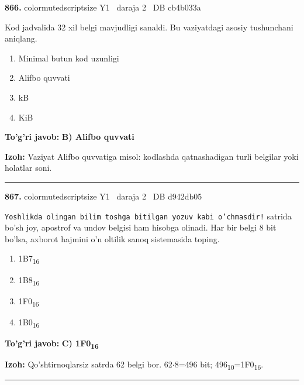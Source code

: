 \documentclass[10pt,a4paper,oneside]{article}
\begin{document}
\noindent\textbf{\color{ink}866.}  {color{muted}scriptsize Y1 \textbullet\ daraja 2 \textbullet\ DB cb4b033a}
\par
Kod jadvalida 32 xil belgi mavjudligi sanaldi. Bu vaziyatdagi asosiy tushunchani aniqlang.
\begin{enumerate}[label=\Alph*),leftmargin=9mm]
\item Minimal butun kod uzunligi
\item Alifbo quvvati
\item kB
\item KiB
\end{enumerate}
\begin{tcolorbox}[enhanced,breakable,colback=teal!4,colframe=teal!50!black,boxrule=0.5pt,arc=1.1mm,left=3mm,right=3mm,top=1.7mm,bottom=1.7mm,before skip=2mm,after skip=2mm]
\textbf{\color{teal}To'g'ri javob:} \textbf{B) Alifbo quvvati}
\par\smallskip
\textbf{Izoh:} Vaziyat Alifbo quvvatiga misol: kodlashda qatnashadigan turli belgilar yoki holatlar soni.
\end{tcolorbox}
\vspace{2mm}\hrule height 0.2pt \vspace{3mm}

\noindent\textbf{\color{ink}867.}  {color{muted}scriptsize Y1 \textbullet\ daraja 2 \textbullet\ DB d942db05}
\par
\texttt{Yoshlikda olingan bilim toshga bitilgan yozuv kabi o'chmasdir!} satrida bo'sh joy, apostrof va undov belgisi ham hisobga olinadi. Har bir belgi 8 bit bo'lsa, axborot hajmini o'n oltilik sanoq sistemasida toping.
\begin{enumerate}[label=\Alph*),leftmargin=9mm]
\item 1B7\textsubscript{1}\textsubscript{6}
\item 1B8\textsubscript{1}\textsubscript{6}
\item 1F0\textsubscript{1}\textsubscript{6}
\item 1B0\textsubscript{1}\textsubscript{6}
\end{enumerate}
\begin{tcolorbox}[enhanced,breakable,colback=teal!4,colframe=teal!50!black,boxrule=0.5pt,arc=1.1mm,left=3mm,right=3mm,top=1.7mm,bottom=1.7mm,before skip=2mm,after skip=2mm]
\textbf{\color{teal}To'g'ri javob:} \textbf{C) 1F0\textsubscript{1}\textsubscript{6}}
\par\smallskip
\textbf{Izoh:} Qo'shtirnoqlarsiz satrda 62 belgi bor. 62\ensuremath{\cdot}8=496 bit; 496\textsubscript{1}\textsubscript{0}=1F0\textsubscript{1}\textsubscript{6}.
\end{tcolorbox}
\vspace{2mm}\hrule height 0.2pt \vspace{3mm}
\end{document}
